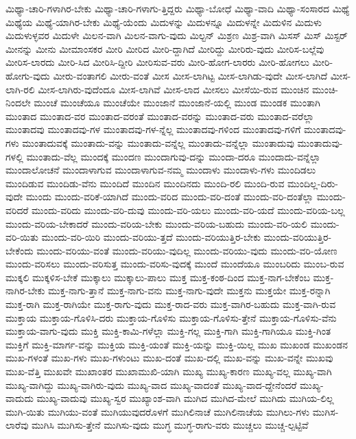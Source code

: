 {ಮಿಥ್ಯಾ-ಚಾರಿ-ಗಳಾಗಿರ-ಬೇಕು
ಮಿಥ್ಯಾ-ಚಾರಿ-ಗಳಾಗು-ತ್ತಿದ್ದರು
ಮಿಥ್ಯಾ-ಬೋಧೆ
ಮಿಥ್ಯಾ-ವಾದಿ
ಮಿಥ್ಯಾ-ಸಂಸಾರದ
ಮಿಥ್ಯೆ
ಮಿಥ್ಯೆಯ
ಮಿಥ್ಯೆ-ಯಾಗಿರ-ಬೇಕು
ಮಿಥ್ಯೆ-ಯೆಂದು
ಮಿದುಳನ್ನು
ಮಿದುಳನ್ನೂ
ಮಿದುಳನ್ನೇ
ಮಿದುಳಿನ
ಮಿದುಳು
ಮಿದುಳುಳ್ಳವರ
ಮಿದುಳೇ
ಮಿಲನ-ವಾಗಿ
ಮಿಲನ-ವಾಗು-ವುದು
ಮಿಲ್ಟನ್
ಮಿಶ್ರಣ
ಮಿಶ್ರ-ವಾಗಿ
ಮಿಸಸ್
ಮಿಸ್
ಮಿಸ್ಟರ್
ಮೀನನ್ನು
ಮೀನು
ಮೀಮಾಂಸಕರ
ಮೀರಿ
ಮೀರಿದ
ಮೀರಿ-ದ್ದಾಗಿದೆ
ಮೀರಿದ್ದು
ಮೀರಿರು-ವುದು
ಮೀರಿಸ-ಬಲ್ಲೆವು
ಮೀರಿಸ-ಲಾರದು
ಮೀರಿ-ಸಿದ
ಮೀರಿಸಿ-ದ್ದೀರಿ
ಮೀರಿಸುವ-ವರು
ಮೀರಿ-ಹೋಗ-ಲಾರರು
ಮೀರಿ-ಹೋಗಲು
ಮೀರಿ-ಹೋಗು-ವುದು
ಮೀರು-ವಂತಾಗಲಿ
ಮೀರು-ವಂತೆ
ಮೀಸ
ಮೀಸ-ಲಾಗಿಟ್ಟ
ಮೀಸ-ಲಾಗಿಡು-ವುದೇ
ಮೀಸ-ಲಾಗಿದೆ
ಮೀಸ-ಲಾಗಿ-ರಲಿ
ಮೀಸ-ಲಾಗಿರು-ವುದೆಂದೂ
ಮೀಸ-ಲಾಗಿವೆ
ಮೀಸ-ಲಾದ
ಮೀಸಲು
ಮೀಸೆಯಿ-ರುವ
ಮುಂಚಿನ
ಮುಂಚಿ-ನಿಂದಲೇ
ಮುಂಚೆ
ಮುಂಚೆಯೂ
ಮುಂಚೆಯೇ
ಮುಂಜಾನೆ
ಮುಂಜಾನೆ-ಯಲ್ಲಿ
ಮುಂಡ
ಮುಂಡಕ
ಮುಂತಾಗಿ
ಮುಂತಾದ
ಮುಂತಾದ-ವರ
ಮುಂತಾದ-ವರಂತೆ
ಮುಂತಾದ-ವರನ್ನು
ಮುಂತಾದ-ವರು
ಮುಂತಾದ-ವರೆಲ್ಲಾ
ಮುಂತಾದವು
ಮುಂತಾದವು-ಗಳ
ಮುಂತಾದವು-ಗಳ-ನ್ನೆಲ್ಲ
ಮುಂತಾದವು-ಗಳಿಂದ
ಮುಂತಾದವು-ಗಳಿಗೆ
ಮುಂತಾದವು-ಗಳು
ಮುಂತಾದುವಕ್ಕೆ
ಮುಂತಾದು-ವನ್ನು
ಮುಂತಾದು-ವನ್ನೆಲ್ಲ
ಮುಂತಾದು-ವನ್ನೆಲ್ಲಾ
ಮುಂತಾದುವು
ಮುಂತಾದುವು-ಗಳಲ್ಲಿ
ಮುಂತಾದು-ವೆಲ್ಲ
ಮುಂದಕ್ಕೆ
ಮುಂದಣ
ಮುಂದಾಗುವು-ದನ್ನು
ಮುಂದಾ-ದರೂ
ಮುಂದಾದು-ವನ್ನೆಲ್ಲಾ
ಮುಂದಾಲೋಚನೆ
ಮುಂದಾಳಾಗುವ
ಮುಂದಾಳಾಗುವ-ನಮ್ಮ
ಮುಂದಾಳು
ಮುಂದಾಳು-ಗಳು
ಮುಂದಿಡಲು
ಮುಂದಿಡುವ
ಮುಂದಿಡು-ವೆನು
ಮುಂದಿದೆ
ಮುಂದಿನ
ಮುಂದಿನದು
ಮುಂದಿ-ರಲಿ
ಮುಂದಿ-ರುವ
ಮುಂದಿಲ್ಲ-ದಿರು-ವುದೇ
ಮುಂದು
ಮುಂದು-ವರಿಕೆ-ಯಾಗಿದೆ
ಮುಂದು-ವರಿದ
ಮುಂದು-ವರಿ-ದಂತೆ
ಮುಂದು-ವರಿ-ದಂತೆಲ್ಲಾ
ಮುಂದು-ವರಿದರೆ
ಮುಂದು-ವರಿದು
ಮುಂದು-ವರಿ-ದುವು
ಮುಂದು-ವರಿ-ಯಲು
ಮುಂದು-ವರಿ-ಯದೆ
ಮುಂದು-ವರಿಯ-ಬಲ್ಲ
ಮುಂದು-ವರಿಯ-ಬೇಕಾದರೆ
ಮುಂದು-ವರಿಯ-ಬೇಕು
ಮುಂದು-ವರಿಯ-ಬಹುದು
ಮುಂದು-ವರಿ-ಯಲಿ
ಮುಂದು-ವರಿ-ಯಿತು
ಮುಂದು-ವರಿ-ಯಿರಿ
ಮುಂದು-ವರಿಯು-ತ್ತದೆ
ಮುಂದು-ವರಿಯುತ್ತಿರ-ಬೇಕು
ಮುಂದು-ವರಿಯುತ್ತಿರ-ಬೇಕೆಂದು
ಮುಂದು-ವರಿಯು-ವಂತೆ
ಮುಂದು-ವರಿಯು-ವುದಿಲ್ಲ
ಮುಂದು-ವರಿಯು-ವುದು
ಮುಂದು-ವರಿ-ಯೋಣ
ಮುಂದು-ವರಿಸಲು
ಮುಂದು-ವರಿಸುತ್ತ
ಮುಂದು-ವರಿಸು-ವುದಕ್ಕೆ
ಮುಂದೆ
ಮುಂದೆಯೂ
ಮುಂಬರಿದು
ಮುಂಬ-ರುವ
ಮುಕ್ಕಲಿ
ಮುಕ್ಕಳಿಸ-ಬೇಕೆ
ಮುಕ್ಕಾಲು
ಮುಕ್ಕಾಲು-ಪಾಲು
ಮುಕ್ತ
ಮುಕ್ತ-ಕಂಠ-ದಿಂದ
ಮುಕ್ತ-ನಾಗ-ಬೇಕೆಂಬ
ಮುಕ್ತ-ನಾಗಿರ-ಬೇಕು
ಮುಕ್ತ-ನಾಗು-ತ್ತಾನೆ
ಮುಕ್ತ-ನಾಗು-ವನು
ಮುಕ್ತ-ನಾಗು-ವುದೇ
ಮುಕ್ತನು
ಮುಕ್ತಯೇ
ಮುಕ್ತ-ರನ್ನಾಗಿ
ಮುಕ್ತ-ರಾಗಿ
ಮುಕ್ತ-ರಾಗಿಯೇ
ಮುಕ್ತ-ರಾಗು-ವುದು
ಮುಕ್ತ-ರಾದ-ವರು
ಮುಕ್ತ-ವಾಗಿರ-ಬಹುದು
ಮುಕ್ತ-ವಾಗಿ-ರುವ
ಮುಕ್ತಾಯ
ಮುಕ್ತಾಯ-ಗೊಳಿಸಿ-ದರು
ಮುಕ್ತಾಯ-ಗೊಳಿಸು
ಮುಕ್ತಾಯ-ಗೊಳಿಸು-ತ್ತೇನೆ
ಮುಕ್ತಾಯ-ಗೊಳಿಸು-ವೆನು
ಮುಕ್ತಾಯ-ವಾಗು-ವುದು
ಮುಕ್ತಿ
ಮುಕ್ತಿ-ಕಾಮಿ-ಗಳೆಲ್ಲಾ
ಮುಕ್ತಿ-ಗಲ್ಲ
ಮುಕ್ತಿ-ಗಾಗಿ
ಮುಕ್ತಿ-ಗಾಗಿಯೂ
ಮುಕ್ತಿ-ಗಿಂತ
ಮುಕ್ತಿಗೆ
ಮುಕ್ತಿ-ಮಾರ್ಗ-ವನ್ನು
ಮುಕ್ತಿಯ
ಮುಕ್ತಿ-ಯಂತೆ
ಮುಕ್ತಿ-ಯನ್ನು
ಮುಕ್ತಿ-ಯಿಲ್ಲ
ಮುಖ
ಮುಖಂಡ
ಮುಖಂಡನ
ಮುಖ-ಗಳಂತೆ
ಮುಖ-ಗಳು
ಮುಖ-ಗಳುಂಟು
ಮುಖ-ದಂತೆ
ಮುಖ-ದಲ್ಲಿ
ಮುಖ-ವನ್ನು
ಮುಖ-ವನ್ನೇ
ಮುಖವು
ಮುಖ-ವೆತ್ತಿ
ಮುಖವೇ
ಮುಖಾಂತರ
ಮುಖಾಮುಖಿ-ಯಾಗಿ
ಮುಖ್ಯ
ಮುಖ್ಯ-ಕಾರಣ
ಮುಖ್ಯ-ವಲ್ಲ
ಮುಖ್ಯ-ವಾಗಿ
ಮುಖ್ಯ-ವಾಗಿದ್ದು
ಮುಖ್ಯ-ವಾಗಿರು-ವುದು
ಮುಖ್ಯ-ವಾದ
ಮುಖ್ಯ-ವಾದಂತೆ
ಮುಖ್ಯ-ವಾದ-ದ್ದೇನೆಂದರೆ
ಮುಖ್ಯ-ವಾದುದು
ಮುಖ್ಯ-ವಾದುವು
ಮುಖ್ಯ-ಸ್ವರ
ಮುಖ್ಯಾಂಶ-ವಾಗಿ
ಮುಗಿದ
ಮುಗಿದ-ಮೇಲೆ
ಮುಗಿದು
ಮುಗಿಯ-ಲಿಲ್ಲ
ಮುಗಿ-ಯಿತು
ಮುಗಿಯು-ವಂತೆ
ಮುಗಿಯುವುದರೊಳಗೆ
ಮುಗಿಲಿನಾಚೆ
ಮುಗಿಲಿನಾಚೆಯ
ಮುಗಿಲು-ಗಳು
ಮುಗಿಸ-ಲಾರೆವು
ಮುಗಿಸಿ
ಮುಗಿಸು-ತ್ತೇನೆ
ಮುಗಿಸು-ವುದು
ಮುಗ್ಧ
ಮುಗ್ಧ-ರಾಗು-ವರು
ಮುಚ್ಚಲು
ಮುಚ್ಚ-ಲ್ಪಟ್ಟಿವೆ
}
